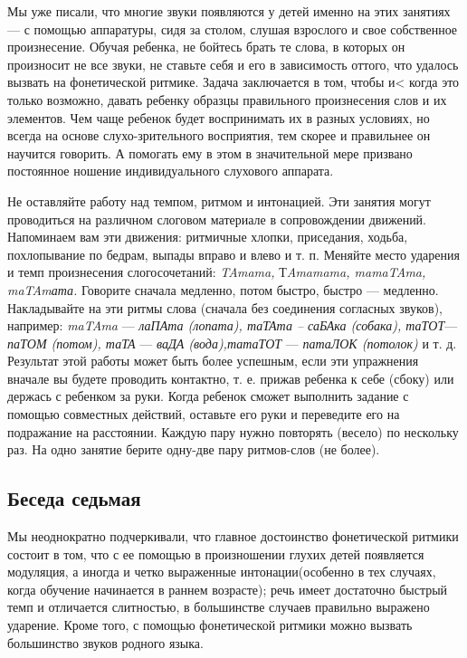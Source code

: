 \documentclass{book}
\renewcommand{\emph}[1]{\textit{#1}}
\begin{document}
Мы уже писали, что многие звуки появляются у детей именно на этих
занятиях --- с помощью аппаратуры, сидя за столом, слушая взрослого и
свое собственное произнесение. Обучая ребенка, не бойтесь брать те
слова, в которых он произносит не все звуки, не ставьте себя и его в
зависимость оттого, что удалось вызвать на фонетической ритмике. Задача
заключается в том, чтобы и\textless{} когда это только возможно, давать
ребенку образцы правильного произнесения слов и их элементов. Чем чаще
ребенок будет воспринимать их в разных условиях, но всегда на основе
слухо-зрительного восприятия, тем скорее и правильнее он научится
говорить. А помогать ему в этом в значительной мере призвано постоянное
ношение индивидуального слухового аппарата.

Не оставляйте работу над темпом, ритмом и интонацией. Эти занятия могут
проводиться на различном слоговом материале в сопровождении движений.
Напоминаем вам эти движения: ритмичные хлопки, приседания, ходьба,
похлопывание по бедрам, выпады вправо и влево и т. п. Меняйте место
ударения и темп произнесения слогосочетаний: \emph{TAmama,}
Т\emph{Amamama, mamaTAma, maTAmата.} Говорите сначала медленно, потом
быстро, быстро --- медленно. Накладывайте на эти ритмы слова (сначала
без соединения согласных звуков), например: \emph{maTAma} ---
\emph{лаПАта (лопата), таТАта -- саБАка (собака), таТОТ}--- \emph{паТОМ
(потом), таТА} --- \emph{ваДА (вода),татаТОТ} --- \emph{патаЛОК
(потолок)} и т. д. Результат этой работы может быть более успешным, если
эти упражнения вначале вы будете проводить контактно, т. е. прижав
ребенка к себе (сбоку) или держась с ребенком за руки. Когда ребенок
сможет выполнить задание с помощью совместных действий, оставьте его
руки и переведите его на подражание на расстоянии. Каждую пару нужно
повторять (весело) по нескольку раз. На одно занятие берите одну-две
пару ритмов-слов (не более).

\subsection*{Беседа седьмая}

Мы неоднократно подчеркивали, что главное достоинство фонетической
ритмики состоит в том, что с ее помощью в произношении глухих детей
появляется модуляция, а иногда и четко выраженные интонации(особенно в
тех случаях, когда обучение начинается в раннем возрасте); речь имеет
достаточно быстрый темп и отличается слитностью, в большинстве случаев
правильно выражено ударение. Кроме того, с помощью фонетической ритмики
можно вызвать большинство звуков родного языка.
\end{document}
